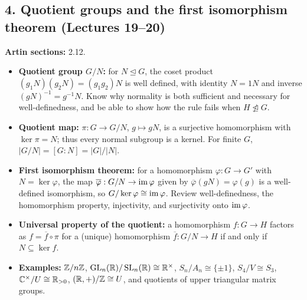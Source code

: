 \documentclass[11pt,reqno]{amsart}
\newcommand{\C}{\mathbb{C}}
\begin{document}
\subsection*{4. Quotient groups and the first isomorphism theorem (Lectures 19--20)}
\noindent\textbf{Artin sections:} 2.12.\par
\begin{itemize}
\item \textbf{Quotient group $G/N$:} for $N\trianglelefteq G$, the coset product
$(g_1N)(g_2N)=(g_1g_2)N$ is well defined, with identity $N=1N$ and inverse
$(gN)^{-1}=g^{-1}N$. Know why normality is both sufficient and necessary for
well-definedness, and be able to show how the rule fails when $H\not\trianglelefteq G$.
\item \textbf{Quotient map:} $\pi:G\to G/N$, $g\mapsto gN$, is a surjective
homomorphism with $\ker\pi=N$; thus every normal subgroup is a kernel. For finite
$G$, $|G/N|=[G:N]=|G|/|N|$.
\item \textbf{First isomorphism theorem:} for a homomorphism $\varphi:G\to G'$ with
$N=\ker\varphi$, the map $\overline\varphi:G/N\to\operatorname{im}\varphi$ given by
$\overline\varphi(gN)=\varphi(g)$ is a well-defined isomorphism, so
$G/\ker\varphi\cong\operatorname{im}\varphi$. Review well-definedness, the homomorphism property,
injectivity, and surjectivity onto $\operatorname{im}\varphi$.
\item \textbf{Universal property of the quotient:} a homomorphism $f:G\to H$ factors
as $f=\overline f\circ\pi$ for a (unique) homomorphism $\overline f:G/N\to H$ if and
only if $N\subseteq\ker f$.
\item \textbf{Examples:} $\mathbb{Z}/n\mathbb{Z}$, $\operatorname{GL}_n(\mathbb{R})/\operatorname{SL}_n(\mathbb{R})\cong\mathbb{R}^\times$,
$S_n/A_n\cong\{\pm1\}$, $S_4/V\cong S_3$, $\C^\times/U\cong\R_{>0}$,
$(\mathbb{R},+)/\mathbb{Z}\cong U$, and quotients of upper triangular matrix groups.
\end{itemize}

\newpage
\end{document}
